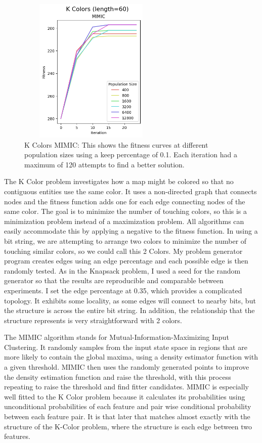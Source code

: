 \documentclass[letterpaper]{article} %
\begin{document}
\begin{figure}[!htb]
\centering
\includegraphics[width=2.75in, height=2.75in]{figures/K_Colors_length=60_MIMIC_l_60_ma_120_p_400__800__1600__3200__6400__12800_k_0.1_.png}
\caption{K Colors MIMIC: This shows the fitness curves at different population sizes using a keep percentage of 0.1. Each iteration had a maximum of 120 attempts to find a better solution. }
\label{fig:kcolor_mimic}
\end{figure}


The K Color problem investigates how a map might be colored so that no contiguous entities use the same color.  It uses a non-directed graph that connects nodes and the fitness function adds one for each edge connecting nodes of the same color.  The goal is to minimize the number of touching colors, so this is a minimization problem instead of a maximization problem.  All algorithms can easily accommodate this by applying a negative to the fitness function.   In using a bit string, we are attempting to arrange two colors to minimize the number of touching similar colors, so we could call this 2 Colors.  My problem generator program creates edges using an edge percentage and each possible edge is then randomly tested.  As in the Knapsack problem, I used a seed for the random generator so that the results are reproducible and comparable between experiments.  I set the edge percentage at 0.35, which provides a complicated topology.  It exhibits some locality, as some edges will connect to nearby bits, but the structure is across the entire bit string.  In addition, the relationship that the structure represents is very straightforward with 2 colors. 

The MIMIC algorithm stands for Mutual-Information-Maximizing Input Clustering.  It randomly samples from the input state space in regions that are more likely to contain the global maxima, using a density estimator function with a given threshold.  MIMIC then uses the randomly generated points to improve the density estimation function and raise the threshold, with this process repeating to raise the threshold and find fitter candidates.  MIMIC is especially well fitted to the K Color problem because  it calculates its probabilities using unconditional probabilities of each feature and pair wise conditional probability between each feature pair.  It is that later that matches almost exactly with the structure of the K-Color problem, where the structure is each edge between two features.  
\end{document}
